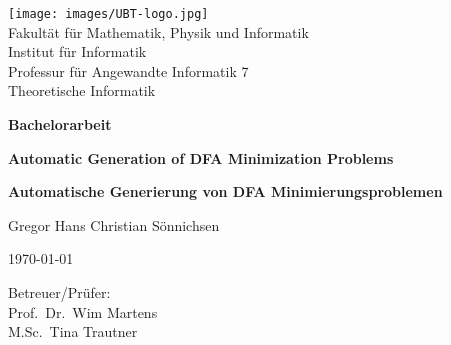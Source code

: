 \documentclass[a4paper, oneside, 11pt]{book}
\theoremstyle{definition}
\theoremstyle{remark}
\begin{document}
	
	\frontmatter
	
	\begin{titlepage}
		{
			\raggedright
			\texttt{[image: images/UBT-logo.jpg]}\\
			\small{
			Fakultät für Mathematik, Physik und Informatik\\
			Institut für Informatik\\
			Professur für Angewandte Informatik 7\\
			Theoretische Informatik}\\
			\vspace{1cm}	
		}
		{\centering\bfseries\Large Bachelorarbeit\par}
		\vspace{1cm}
		{\centering\huge\bfseries Automatic Generation of DFA Minimization Problems\par}
		\vspace{0.7cm}
		{\centering\large\bfseries Automatische Generierung von DFA Minimierungsproblemen\par}
		\vspace{2cm}
		{\centering\large Gregor Hans Christian Sönnichsen\par}
		\vspace{0.4cm}
		{\centering\large \today\par}
		\vfill
		{\large\raggedright
			Betreuer/Prüfer:\\
			Prof.\ Dr.\ Wim Martens\\
			M.Sc.\ Tina Trautner\par
		}
	\end{titlepage}
	
	
	
	
	\renewcommand{\contentsname}{Table of Contents}
	\tableofcontents
	
	\mainmatter
	
	
	
	
	
	
	
\end{document}
